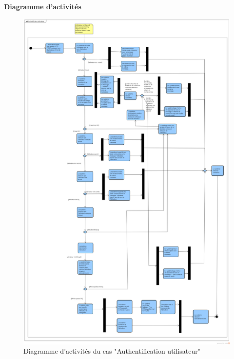 \textbf{\RIGHTarrow Diagramme d'activités}\\
\begin{figure}[H]
	\centering
	\includegraphics[width=1.0\textwidth,height=0.95\textheight]{fig/Authentification-utilisateur-activity-diagram.png}
	\caption{Diagramme d'activités du cas "Authentification utilisateur"}
\end{figure}

